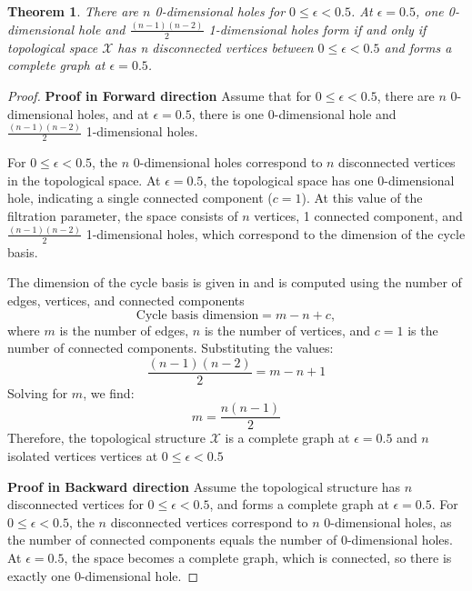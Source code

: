 \documentclass{article}
\newtheorem{theorem}{Theorem}
\begin{document}
\begin{theorem}

There are $ n $ 0-dimensional holes for $ 0 \leq \epsilon < 0.5 $. At $ \epsilon = 0.5 $, one 0-dimensional hole and $ \frac{(n-1)(n-2)}{2} $ 1-dimensional holes form if and only if topological space $\mathcal{X}$ has n disconnected vertices between  $ 0 \leq \epsilon < 0.5 $ and forms a complete graph at  $ \epsilon = 0.5$.
\end{theorem}
\begin{proof}
\textbf{Proof in Forward direction}
Assume that for $ 0 \leq \epsilon < 0.5 $, there are $ n $ 0-dimensional holes, and at $ \epsilon = 0.5 $, there is one 0-dimensional hole and $ \frac{(n-1)(n-2)}{2} $ 1-dimensional holes.

For $ 0 \leq \epsilon < 0.5 $, the $ n $ 0-dimensional holes correspond to $ n $ disconnected vertices in the topological space. At $ \epsilon = 0.5 $, the topological space has one 0-dimensional hole, indicating a single connected component ($ c = 1 $). At this value of the filtration parameter, the space consists of $ n $ vertices, 1 connected component, and $ \frac{(n-1)(n-2)}{2} $ 1-dimensional holes, which correspond to the dimension of the cycle basis.

The dimension of the cycle basis is given in \cite{hage1996island} and is computed using the number of edges, vertices, and connected components
\begin{equation}
\text{Cycle basis dimension} = m - n + c,
\end{equation}
where $ m $ is the number of edges, $ n $ is the number of vertices, and $ c = 1 $ is the number of connected components. Substituting the values:
\begin{equation}
\frac{(n-1)(n-2)}{2} = m - n + 1
\end{equation}
Solving for $ m $, we find:
\begin{equation}
m = \frac{n(n-1)}{2}
\end{equation}
Therefore, the topological structure $ \mathcal{X} $ is a complete graph at $\epsilon = 0.5$ and $n$ isolated vertices vertices at $ 0 \leq \epsilon < 0.5 $

\textbf{Proof in Backward direction}
Assume the topological structure has $ n $ disconnected vertices for $ 0 \leq \epsilon < 0.5 $, and forms a complete graph at $ \epsilon = 0.5 $. For $ 0 \leq \epsilon < 0.5 $, the $ n $ disconnected vertices correspond to $ n $ 0-dimensional holes, as the number of connected components equals the number of 0-dimensional holes. At $ \epsilon = 0.5 $, the space becomes a complete graph, which is connected, so there is exactly one 0-dimensional hole.


\end{proof}
\end{document}
